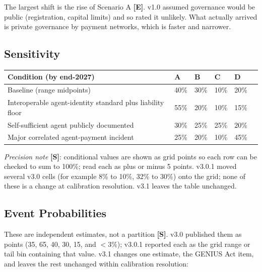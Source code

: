 \documentclass[11pt,letterpaper]{article}
\begin{document}
The largest shift is the rise of Scenario A \textbf{[E]}. v1.0 assumed governance would be public (registration, capital limits) and so rated it unlikely. What actually arrived is private governance by payment networks, which is faster and narrower.

\subsection{Sensitivity}

\begin{center}
\small
\begin{tabularx}{\linewidth}{ZY{2.29}Y{0.68}Y{0.68}Y{0.68}Y{0.67}}
\toprule
\textbf{Condition (by end-2027)} & \textbf{A} & \textbf{B} & \textbf{C} & \textbf{D} \\
\midrule
Baseline (range midpoints) & 40\% & 30\% & 10\% & 20\% \\
Interoperable agent-identity standard plus liability floor & 55\% & 20\% & 10\% & 15\% \\
Self-sufficient agent publicly documented & 30\% & 25\% & 25\% & 20\% \\
Major correlated agent-payment incident & 25\% & 20\% & 10\% & 45\% \\
\bottomrule
\end{tabularx}
\end{center}

\textit{Precision note} \textbf{[S]}: conditional values are shown as grid points so each row can be checked to sum to 100\%; read each as plus or minus 5 points. v3.0.1 moved several v3.0 cells (for example 8\% to 10\%, 32\% to 30\%) onto the grid; none of these is a change at calibration resolution. v3.1 leaves the table unchanged.

\subsection{Event Probabilities}
\label{sec:events}

These are independent estimates, not a partition \textbf{[S]}. v3.0 published them as points (35, 65, 40, 30, 15, and $<$3\%); v3.0.1 reported each as the grid range or tail bin containing that value. v3.1 changes one estimate, the GENIUS Act item, and leaves the rest unchanged within calibration resolution:
\end{document}
